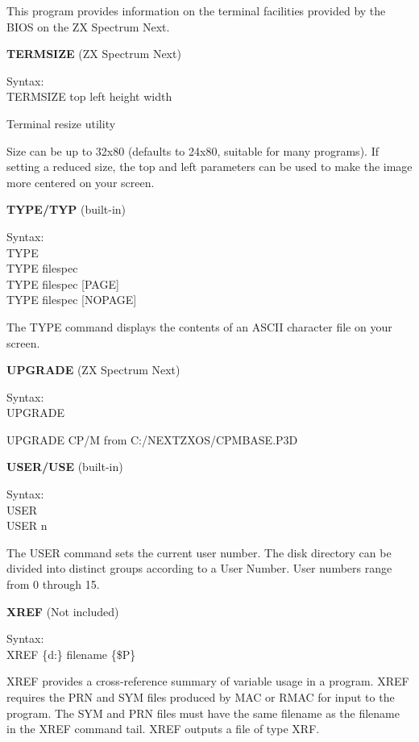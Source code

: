 This program provides information on the terminal facilities provided
by the BIOS on the ZX Spectrum Next.

\textbf{TERMSIZE} (ZX Spectrum Next)

\hangindent=0.7cm Syntax:\\
TERMSIZE top left height width

Terminal resize utility

Size can be up to 32x80 (defaults to 24x80, suitable for many
programs). If setting a reduced size, the top and left parameters can
be used to make the image more centered on your screen.

\textbf{TYPE/TYP} (built-in)

\hangindent=0.7cm Syntax:\\
TYPE\\
TYPE filespec\\
TYPE filespec [PAGE]\\
TYPE filespec [NOPAGE]

The TYPE command displays the contents of an ASCII character file on
your screen.

\textbf{UPGRADE} (ZX Spectrum Next)

\hangindent=0.7cm Syntax:\\
UPGRADE

UPGRADE CP/M from C:/NEXTZXOS/CPMBASE.P3D

\textbf{USER/USE} (built-in)

\hangindent=0.7cm Syntax:\\
USER\\
USER n

The USER command sets the current user number. The disk directory can
be divided into distinct groups according to a User Number. User
numbers range from 0 through 15.

\textbf{XREF} (Not included)

\hangindent=0.7cm Syntax:\\
XREF \{d:\} filename \{\$P\}

XREF provides a cross-reference summary of variable usage in a
program. XREF requires the PRN and SYM files produced by MAC or RMAC
for input to the program. The SYM and PRN files must have the same
filename as the filename in the XREF command tail. XREF outputs a file
of type XRF.
